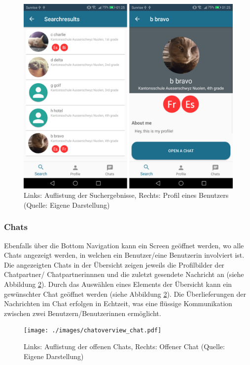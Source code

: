 \documentclass[../main.tex]{subfiles}
\begin{document}
\begin{figure} 
	\centering
	\includegraphics[width=\textwidth]{./images/searchresults_userprofile.pdf}
	\caption{Links: Auflistung der Suchergebnisse, Rechts: Profil eines Benutzers (Quelle: Eigene Darstellung)}
	\label{results_profile}
\end{figure}

\subsubsection*{Chats}
Ebenfalls über die Bottom Navigation kann ein Screen geöffnet werden, wo alle Chats angezeigt werden, in welchen ein Benutzer/eine Benutzerin involviert ist. Die angezeigten Chats in der Übersicht zeigen jeweils die Profilbilder der Chatpartner/ Chatpartnerinnnen und die zuletzt gesendete Nachricht an (siehe Abbildung \ref{chat}). Durch das Auswählen eines Elements der Übersicht kann ein gewünschter Chat geöffnet werden (siehe Abbildung \ref{chat}). Die Überlieferungen der Nachrichten im Chat erfolgen in Echtzeit, was eine flüssige Kommunikation zwischen zwei Benutzern/Benutzerinnen ermöglicht.

\begin{figure} 
	\centering
	\texttt{[image: ./images/chatoverview\_chat.pdf]}
	\caption{Links: Auflistung der offenen Chats, Rechts: Offener Chat (Quelle: Eigene Darstellung)}
	\label{chat}
\end{figure}
\end{document}
